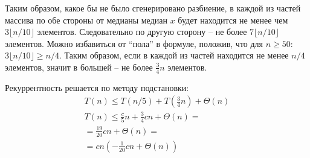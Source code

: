 \documentclass[11pt]{article}
\begin{document}
Таким образом, какое бы не было сгенерировано разбиение, в каждой из частей массива по обе стороны от медианы медиан $x$ будет находится не менее чем $3 \lfloor n/10 \rfloor$ элементов. Следовательно по другую сторону -- не более $7 \lfloor n/10 \rfloor$ элементов. Можно избавиться от ``пола'' в формуле, положив, что для $n \geqslant 50$: $3 \lfloor n/10 \rfloor \geqslant n/4$. Таким образом, если в каждой из частей находится не менее $n/4$ элементов, значит в большей -- не более $\frac{3}{4}n$ элементов.

Рекуррентность решается по методу подстановки:
\begin{align*}
  T(n) \leqslant T(n/5) + T(\frac{3}{4}n) + \Theta(n) \\
  T(n) \leqslant \frac{c}{5}n + \frac{3}{4}cn + \Theta(n) = \\
  = \frac{19}{20}cn + \Theta(n) = \\
  = cn (-\frac{1}{20}cn + \Theta(n))
\end{align*}
\end{document}
